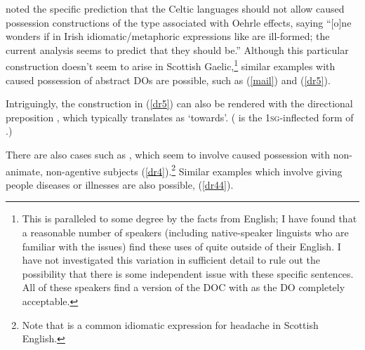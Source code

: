 \documentclass[output=paper,colorlinks,citecolor=brown]{langscibook}
\begin{document}
\citet[67, fn 12]{gt:Harley:2002a}  noted the specific prediction that the Celtic languages should not allow caused possession constructions of the type associated with Oehrle effects, saying ``[o]ne wonders if in Irish idiomatic/metaphoric expressions like  are ill-formed; the current analysis seems to predict that they should be.'' Although this particular construction doesn't seem to arise in Scottish Gaelic,\footnote{This is paralleled to some degree by the facts from English; I have found that a reasonable number of speakers (including native-speaker linguists who are familiar with the issues) find these  uses of  quite outside of their English. I have not investigated this variation in sufficient detail to rule out the possibility that there is some independent issue with these specific sentences. All of these speakers find a version of the DOC with  as the DO completely acceptable. } similar examples with caused possession of abstract DOs are possible, such as (\ref{mail}) and (\ref{dr5}). 



\noindent Intriguingly, the construction in (\ref{dr5}) can also be rendered with the directional preposition , which typically translates as `towards'. ( is the 1\textsc{sg}-inflect\-ed form of .)


\noindent There are also cases such as , which seem to involve caused possession with non-animate, non-agentive subjects (\ref{dr4}).\footnote{Note that  is a common idiomatic expression for headache in Scottish English.} Similar examples which involve giving people diseases or illnesses are also possible, (\ref{dr44}). 
\end{document}
